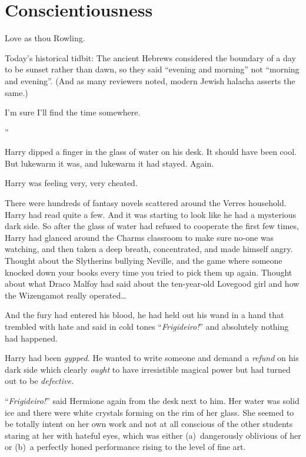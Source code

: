 \chapter{Conscientiousness}

\begin{chapterOpeningAuthorNote}
Love as thou Rowling.

Today's historical tidbit: The ancient Hebrews considered the boundary of a day to be sunset rather than dawn, so they said “evening and morning” not “morning and evening”. (And as many reviewers noted, modern Jewish halacha asserts the same.)
\end{chapterOpeningAuthorNote}
\begin{chapterOpeningQuote}
I'm sure I'll find the time somewhere.
\end{chapterOpeningQuote}

”

\hplettrineextrapara
Harry dipped a finger in the glass of water on his desk. It should have been cool. But lukewarm it was, and lukewarm it had stayed. Again.

Harry was feeling very, very cheated.

There were hundreds of fantasy novels scattered around the Verres household. Harry had read quite a few. And it was starting to look like he had a mysterious dark side. So after the glass of water had refused to cooperate the first few times, Harry had glanced around the Charms classroom to make sure no-one was watching, and then taken a deep breath, concentrated, and made himself angry. Thought about the Slytherins bullying Neville, and the game where someone knocked down your books every time you tried to pick them up again. Thought about what Draco Malfoy had said about the ten-year-old Lovegood girl and how the Wizengamot really operated…

And the fury had entered his blood, he had held out his wand in a hand that trembled with hate and said in cold tones “\emph{Frigideiro!}” and absolutely nothing had happened.

Harry had been \emph{gypped.} He wanted to write someone and demand a \emph{refund} on his dark side which clearly \emph{ought} to have irresistible magical power but had turned out to be \emph{defective.}

“\emph{Frigideiro!}” said Hermione again from the desk next to him. Her water was solid ice and there were white crystals forming on the rim of her glass. She seemed to be totally intent on her own work and not at all conscious of the other students staring at her with hateful eyes, which was either (a)~dangerously oblivious of her or (b)~a perfectly honed performance rising to the level of fine art.


